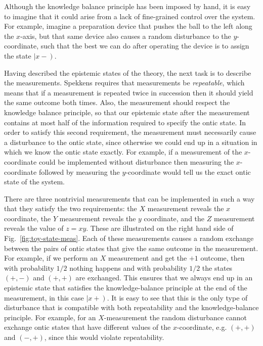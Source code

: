 \documentclass[DIV=calc,fontsize=12pt]{scrartcl} %
\theoremstyle{definition}
\theoremstyle{plain}
\newcommand{\RKet}[1]{\ensuremath{\left \vert #1 \right )}}
\begin{document}
Although the knowledge balance principle has been imposed by hand, it
is easy to imagine that it could arise from a lack of fine-grained
control over the system.  For example, imagine a preparation device
that pushes the ball to the left along the $x$-axis, but that same
device also causes a random disturbance to the $y$-coordinate, such
that the best we can do after operating the device is to assign the
state $\RKet{x-}$.

Having described the epistemic states of the theory, the next task is
to describe the measurements.  Spekkens requires that measurements be
\emph{repeatable}, which means that if a measurement is repeated twice
in succession then it should yield the same outcome both times.  Also,
the measurement should respect the knowledge balance principle, so
that our epistemic state after the measurement contains at most half
of the information required to specify the ontic state.  In order to
satisfy this second requirement, the measurement must necessarily
cause a disturbance to the ontic state, since otherwise we could end
up in a situation in which we know the ontic state exactly.  For
example, if a measurement of the $x$-coordinate could be implemented
without disturbance then measuring the $x$-coordinate followed by
measuring the $y$-coordinate would tell us the exact ontic state of
the system.

There are three nontrivial measurements that can be implemented in
such a way that they satisfy the two requirements: the $X$ measurement
reveals the $x$ coordinate, the $Y$ measurement reveals the $y$
coordinate, and the $Z$ measurement reveals the value of $z=xy$.
These are illustrated on the right hand side of
Fig.~\ref{fig:toy-state-meas}.  Each of these measurements causes a
random exchange between the pairs of ontic states that give the same
outcome in the measurement.  For example, if we perform an $X$
measurement and get the $+1$ outcome, then with probability $1/2$
nothing happens and with probability $1/2$ the states $(+,-)$ and
$(+,+)$ are exchanged.  This ensures that we always end up in an
epistemic state that satisfies the knowledge-balance principle at the
end of the measurement, in this case $\RKet{x+}$.  It is easy to see
that this is the only type of disturbance that is compatible with both
repeatability and the knowledge-balance principle.  For example, for
an $X$-measurement the random disturbance cannot exchange ontic states
that have different values of the $x$-coordinate, e.g. $(+,+)$ and
$(-,+)$, since this would violate repeatability.
\end{document}
